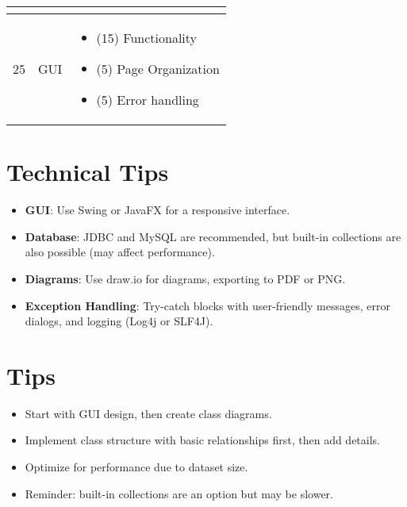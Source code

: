 \documentclass{article}
\begin{document}
\begin{tabular}{|c|l|p{10cm}|}
\begin{itemize}
\end{itemize} \\


\hline


25 & GUI & \begin{itemize}


    \item (15) Functionality


    \item (5) Page Organization


    \item (5) Error handling


\end{itemize} \\


\hline


\end{tabular}






\section*{Technical Tips}


\begin{itemize}


    \item \textbf{GUI}: Use Swing or JavaFX for a responsive interface.


    \item \textbf{Database}: JDBC and MySQL are recommended, but built-in collections are also possible (may affect performance).


    \item \textbf{Diagrams}: Use draw.io for diagrams, exporting to PDF or PNG.


    \item \textbf{Exception Handling}: Try-catch blocks with user-friendly messages, error dialogs, and logging (Log4j or SLF4J).


\end{itemize}






\section*{Tips}


\begin{itemize}


    \item Start with GUI design, then create class diagrams.


    \item Implement class structure with basic relationships first, then add details.


    \item Optimize for performance due to dataset size.


    \item Reminder: built-in collections are an option but may be slower.


\end{itemize}
\end{document}
